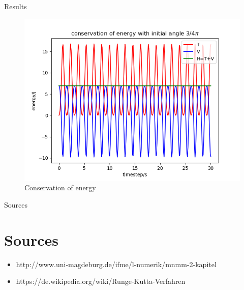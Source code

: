 \documentclass[9pt]{beamer}
\begin{document}
\begin{frame}{Results}
\begin{figure}
	\centering
	\includegraphics[scale=0.5]{Figure_3.png}
	\caption{Conservation of energy}
\end{figure}
\end{frame}

\begin{frame}{Sources}
\section{Sources}
\begin{itemize}
\item http://www.uni-magdeburg.de/ifme/l-numerik/mnmm-2-kapitel%
\item https://de.wikipedia.org/wiki/Runge-Kutta-Verfahren
\end{itemize}


\end{frame}
\end{document}
